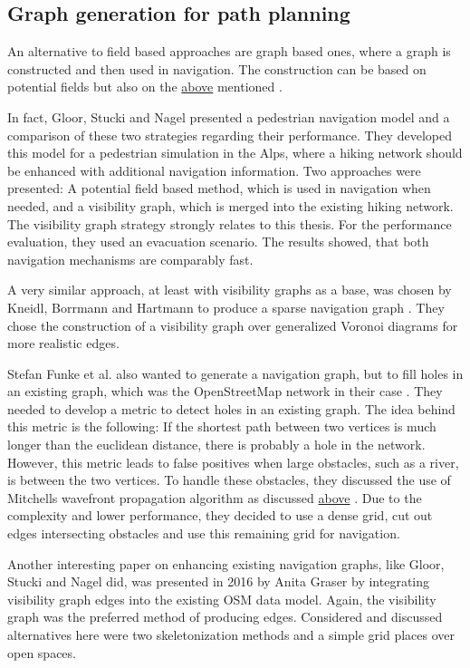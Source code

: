 	
	\subsection{Graph generation for path planning}
	
		An alternative to field based approaches are graph based ones, where a graph is constructed and then used in navigation.
		The construction can be based on potential fields but also on the \hyperref[subsec:related-work:visibility-graph]{above} mentioned .
		
		In fact, Gloor, Stucki and Nagel presented a pedestrian navigation model and a comparison of these two strategies regarding their performance\cite{gloor-hybrid-pedestrian-routing}.
		They developed this model for a pedestrian simulation in the Alps, where a hiking network should be enhanced with additional navigation information.
		Two approaches were presented: A potential field based method, which is used in navigation when needed, and a visibility graph, which is merged into the existing hiking network.
		The visibility graph strategy strongly relates to this thesis.
		For the performance evaluation, they used an evacuation scenario.
		The results showed, that both navigation mechanisms are comparably fast.
		
		A very similar approach, at least with visibility graphs as a base, was chosen by Kneidl, Borrmann and Hartmann to produce a sparse navigation graph \cite[5]{kneidl-borrmann-hartmann-navigation}.
		They chose the construction of a visibility graph over generalized Voronoi diagrams for more realistic edges.
		
		Stefan Funke et al. also wanted to generate a navigation graph, but to fill holes in an existing graph, which was the OpenStreetMap network in their case \cite{funke-osm-extrapolation}.
		They needed to develop a metric to detect holes in an existing graph.
		The idea behind this metric is the following: If the shortest path between two vertices is much longer than the euclidean distance, there is probably a hole in the network.
		However, this metric leads to false positives when large obstacles, such as a river, is between the two vertices.
		To handle these obstacles, they discussed the use of Mitchells wavefront propagation algorithm as discussed \hyperref[related-work:mitchell]{above} \cite[4]{funke-osm-extrapolation}.
		Due to the complexity and lower performance, they decided to use a dense grid, cut out edges intersecting obstacles and use this remaining grid for navigation.
		
		Another interesting paper on enhancing existing navigation graphs, like Gloor, Stucki and Nagel did, was presented in 2016 by Anita Graser by integrating visibility graph edges into the existing OSM data model\cite{graser-osm-open-spaces}.
		Again, the visibility graph was the preferred method of producing edges.
		Considered and discussed alternatives here were two skeletonization methods and a simple grid places over open spaces.